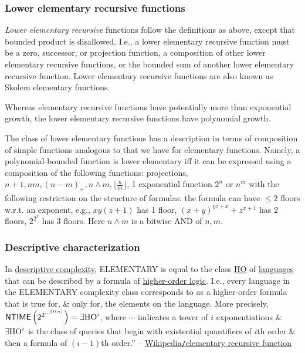 \documentclass{article}
\begin{document}
\subsubsection{Lower elementary recursive functions}
{\it Lower elementary recursive} functions follow the definitions as above, except that bounded product is disallowed. I.e., a lower elementary recursive function must be a zero, successor, or projection function, a composition of other lower elementary recursive functions, or the bounded sum of another lower elementary recursive function. Lower elementary recursive functions are also known as Skolem elementary functions.

Whereas elementary recursive functions have potentially more than exponential growth, the lower elementary recursive functions have polynomial growth.

The class of lower elementary functions has a description in terms of composition of simple functions analogous to that we have for elementary functions. Namely, a polynomial-bounded function is lower elementary iff it can be expressed using a composition of the following functions: projections, $n + 1,nm,(n - m)_+,n\land m,\lfloor\frac{n}{m}\rfloor$, 1 exponential function $2^n$ or $n^m$ with the following restriction on the structure of formulas: the formula can have $\le2$ floors w.r.t. an exponent, e.g., $xy(z + 1)$ has 1 floor, $(x + y)^{yz + x} + z^{x + 1}$ has 2 floors, $2^{2^x}$ has 3 floors. Here $n\land m$ is a bitwise AND of $n,m$.

\subsubsection{Descriptive characterization}
In \href{https://en.wikipedia.org/wiki/Descriptive_complexity}{descriptive complexity}, ELEMENTARY is equal to the class \href{https://en.wikipedia.org/wiki/HO_(complexity)}{HO} of \href{https://en.wikipedia.org/wiki/Language_(computer_science)}{languages} that can be described by a formula of \href{https://en.wikipedia.org/wiki/Higher-order_logic}{higher-order logic}. I.e., every language in the ELEMENTARY complexity class corresponds to as a higher-order formula that is true for, \& only for, the elements on the language. More precisely, ${\sf NTIME}\left(2^{2^{\cdots^{O(n)}}}\right) = \exists{\rm HO}^i$, where $\cdots$ indicates a tower of $i$ exponentiations \& $\exists{\rm HO}^i$ is the class of queries that begin with existential quantifiers of $i$th order \& then a formula of $(i - 1)$th order.'' -- \href{https://en.wikipedia.org/wiki/Elementary_recursive_function}{Wikipedia{\tt/}elementary recursive function}
\end{document}
